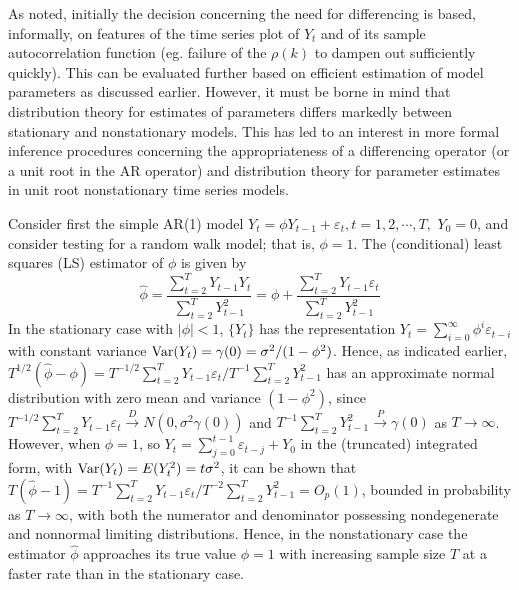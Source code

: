 As noted, initially the decision concerning the need for differencing is based, informally, on features of the time series plot of $Y_t$ and of its sample autocorrelation function (eg. failure of the $\rho(k)$ to dampen out sufficiently quickly). This can be evaluated further based on efficient estimation of model parameters as discussed earlier. However, it must be borne in mind that distribution theory for estimates of parameters differs markedly between stationary and nonstationary models. This has led to an interest in more formal inference procedures concerning the appropriateness of a differencing operator (or a unit root in the AR operator) and distribution theory for parameter estimates in unit root nonstationary time series models.


Consider first the simple AR(1) model $Y_t = \phi Y_{t-1} + \varepsilon_t, t = 1,2,\cdots,T,$ $Y_0 = 0$, and consider testing for a random walk model; that is, $\phi = 1$. The (conditional) least squares (LS) estimator of $\phi$ is given by
	\begin{equation}\label{eqn:futurereffirst}
	\hat{\phi} = \dfrac{\sum_{t=2}^T Y_{t-1}Y_t}{\sum_{t=2}^T Y_{t-1}^2} = \phi + \dfrac{\sum_{t=2}^T Y_{t-1}\varepsilon_t}{\sum_{t=2}^T Y_{t-1}^2}
	\end{equation}
In the stationary case with $|\phi| < 1$, $\{Y_t\}$ has the representation $Y_t = \sum_{i=0}^\infty\phi^i\varepsilon_{t-i}$ with constant variance $\operatorname{Var}(Y_t) = \gamma(0) = \sigma^2/(1-\phi^2)$. Hence, as indicated earlier, $T^{1/2}(\hat{\phi} - \phi) = T^{-1/2}\sum_{t=2}^T Y_{t-1}\varepsilon_t/T^{-1}\sum_{t=2}^TY_{t-1}^2$ has an approximate normal distribution with zero mean and variance $(1 - \phi^2)$, since $T^{-1/2}\sum_{t=2}^T Y_{t-1}\varepsilon_t \xrightarrow{D} N(0,\sigma^2\gamma(0))$ and $T^{-1}\sum_{t=2}^TY_{t-1}^2 \xrightarrow{P} \gamma(0)$ as $T \to \infty$. However, when $\phi = 1$, so $Y_t = \sum_{j=0}^{t-1}\varepsilon_{t-j} + Y_0$ in the (truncated) integrated form, with $\operatorname{Var}(Y_t) = E(Y_t^2) = t\sigma^2$, it can be shown that $T(\hat{\phi} - 1) = T^{-1}\sum_{t=2}^T Y_{t-1}\varepsilon_t/T^{-2}\sum_{t=2}^T Y_{t-1}^2 = O_p(1)$, bounded in probability as $T \rightarrow \infty$, with both the numerator and denominator possessing nondegenerate and nonnormal limiting distributions. Hence, in the nonstationary case the estimator $\hat{\phi}$ approaches its true value $\phi = 1$ with increasing sample size $T$ at a faster rate than in the stationary case.


